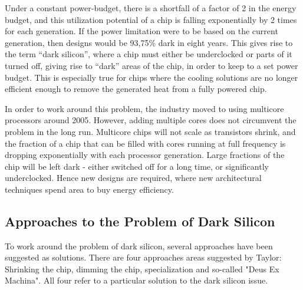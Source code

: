Under a constant power-budget, there is a shortfall of a factor of 2 in the energy budget,
and this utilization potential of a chip is falling exponentially by 2 times for each generation.
If the power limitation were to be based on the current generation, then designs would be 93,75\% dark in eight years.
This gives rise to the term ``dark silicon'', where a chip must either be underclocked or parts of
it turned off, giving rise to ``dark'' areas of the chip, in order to keep to a set power budget.
This is especially true for chips where the cooling solutions are no longer efficient enough to remove
the generated heat from a fully powered chip.

In order to work around this problem, the industry moved to using multicore processors around 2005.
However, adding multiple cores does not circumvent the problem in the long run.
Multicore chips will not scale as transistors shrink, and the fraction of a chip that can be filled with cores running at full frequency is dropping exponentially with each processor generation. 
Large fractions of the chip will be left dark - either switched off for a long time, or significantly underclocked.
Hence new designs are required, where new architectural techniques spend area to buy energy efficiency. \cite{dark-silicon}

\subsection{Approaches to the Problem of Dark Silicon}
\label{sec:taylor}

To work around the problem of dark silicon, several approaches have been suggested as solutions.
There are four approaches areas suggested by Taylor\cite{dark-silicon}: Shrinking the chip, dimming the chip, specialization and so-called "Deus Ex Machina".
All four refer to a particular solution to the dark silicon issue.


